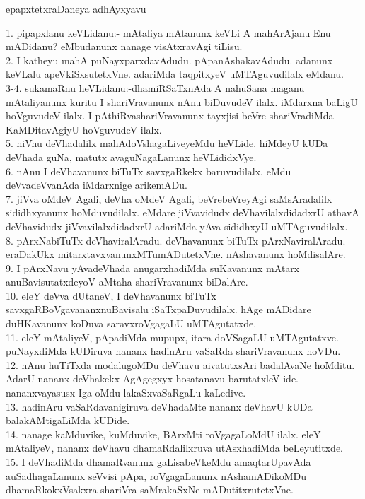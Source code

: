 \documentclass{article}
\begin{document}
\begin{center}
epapxtetxraDaneya adhAyxyavu
\end{center}

1. pipapxlanu keVLidanu:- mAtaliya mAtanunx keVLi A mahArAjanu Enu mADidanu? eMbudanunx nanage visAtxravAgi tiLisu.\\
2. I katheyu mahA puNayxparxdavAdudu. pApanAshakavAdudu. adanunx keVLalu apeVkiSxsutetxVne. adariMda taqpitxyeV uMTAguvudilalx eMdanu.\\
3-4. sukamaRnu heVLidanu:-dhamiRSaTxnAda A nahuSana maganu mAtaliyanunx kuritu I shariVravanunx nAnu biDuvudeV ilalx. iMdarxna baLigU hoVguvudeV ilalx. I pAthiRvashariVravanunx tayxjisi beVre shariVradiMda KaMDitavAgiyU hoVguvudeV ilalx.\\
5. niVnu deVhadalilx mahAdoVshagaLiveyeMdu heVLide. hiMdeyU kUDa deVhada guNa, matutx avaguNagaLanunx heVLididxVye.\\
6. nAnu I deVhavanunx biTuTx savxgaRkekx baruvudilalx, eMdu deVvadeVvanAda iMdarxnige arikemADu.\\
7. jiVva oMdeV Agali, deVha oMdeV Agali, beVrebeVreyAgi saMsAradalilx sididhxyanunx hoMduvudilalx. eMdare jiVvavidudx deVhavilalxdidadxrU athavA deVhavidudx jiVvavilalxdidadxrU adariMda yAva sididhxyU uMTAguvudilalx.\\
8. pArxNabiTuTx deVhaviralAradu. deVhavanunx biTuTx pArxNaviralAradu. eraDakUkx mitarxtavxvanunxMTumADutetxVne. nAshavanunx hoMdisalAre.\\
9. I pArxNavu yAvadeVhada anugarxhadiMda suKavanunx mAtarx anuBavisutatxdeyoV aMtaha shariVravanunx biDalAre.\\
10. eleY deVva dUtaneV, I deVhavanunx biTuTx savxgaRBoVgavananxnuBavisalu iSaTxpaDuvudilalx. hAge mADidare duHKavanunx koDuva saravxroVgagaLU uMTAgutatxde.\\
11. eleY mAtaliyeV, pApadiMda mupupx, itara doVSagaLU uMTAgutatxve. puNayxdiMda kUDiruva nananx hadinAru vaSaRda shariVravanunx noVDu.\\
12. nAnu huTiTxda modalugoMDu deVhavu aivatutxsAri badalAvaNe hoMditu. AdarU nananx deVhakekx AgAgegxyx hosatanavu barutatxleV ide. nananxvayasusx Iga oMdu lakaSxvaSaRgaLu kaLedive.\\
13. hadinAru vaSaRdavanigiruva deVhadaMte nananx deVhavU kUDa balakAMtigaLiMda kUDide.\\
14. nanage kaMduvike, kuMduvike, BArxMti roVgagaLoMdU ilalx. eleY mAtaliyeV, nananx deVhavu dhamaRdalilxruva utAsxhadiMda beLeyutitxde.\\
15. I deVhadiMda dhamaRvanunx gaLisabeVkeMdu amaqtarUpavAda auSadhagaLanunx seVvisi pApa, roVgagaLanunx nAshamADikoMDu dhamaRkokxVsakxra shariVra saMrakaSxNe mADutitxrutetxVne.\\
\end{document}
